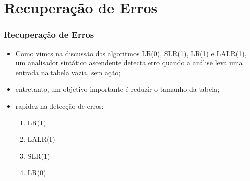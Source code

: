 \documentclass[table]{beamer}
\begin{document}
\section{Recuperação de Erros}

\begin{frame}
   \frametitle{Recuperação de Erros}
   \begin{itemize}
      \item Como vimos na discussão dos algoritmos LR(0), SLR(1), LR(1) e LALR(1), um analisador sintático ascendente detecta erro quando a análise leva uma entrada na tabela vazia, sem ação;
      \item entretanto, um objetivo importante é reduzir o tamanho da tabela;
      \item rapidez na detecção de erros:
      \begin{enumerate}
         \item LR(1)
         \item LALR(1)
         \item SLR(1)
         \item LR(0)       
      \end{enumerate}
      
   \end{itemize}
\end{frame}
\end{document}
